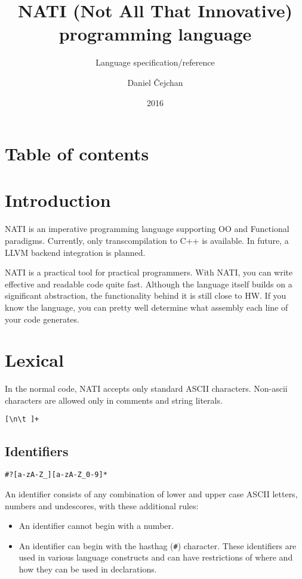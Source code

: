 




\setlength\extrarowheight{2pt}

\title{NATI (Not All That Innovative) programming language}
\subtitle{Language specification/reference}
\author{Daniel Čejchan}
\date{2016}



\mainpage

\chapter{Table of contents}
\makeatletter
{}
\makeatother

\chapter{Introduction}
NATI is an imperative programming language supporting OO and Functional paradigms. Currently, only transcompilation to C++ is available. In future, a LLVM backend integration is planned.

NATI is a practical tool for practical programmers. With NATI, you can write effective and readable code quite fast. Although the language itself builds on a significant abstraction, the functionality behind it is still close to HW. If you know the language, you can pretty well determine what assembly each line of your code generates.

\chapter{Lexical}
In the normal code, NATI accepts only standard ASCII characters. Non-ascii characters are allowed only in comments and string literals.

\begin{grammar}
	 \verb|[\n\t ]+|
\end{grammar}

\section{Identifiers}
\begin{grammar}
	 \verb|#?[a-zA-Z_][a-zA-Z_0-9]*|
\end{grammar}
An identifier consists of any combination of lower and upper case ASCII letters, numbers and undescores, with these additional rules:
\begin{itemize}
	\item An identifier cannot begin with a number.
	\item An identifier can begin with the hasthag (\verb|#|) character. These identifiers are used in various language constructs and can have restrictions of where and how they can be used in declarations.
\end{itemize}


